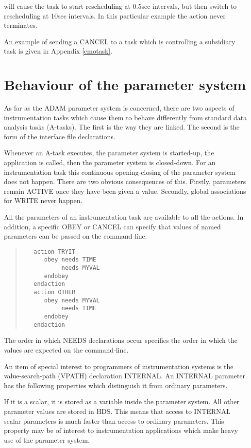 \documentclass[twoside,11pt]{article}
\newcommand{\xlabel}[1]{}
\renewcommand{\_}{\texttt{\symbol{95}}}
\begin{document}
will cause the task to start rescheduling at 0.5sec intervals, but then
switch to rescheduling at 10sec intervals. In this particular example
the action never terminates.

An example of sending a CANCEL to a task which is controlling a
subsidiary task is given in Appendix \ref{cmotask}.

\section{Behaviour of the parameter system
\xlabel{behaviour_of_the_parameter_system}}

As far as the ADAM parameter system is concerned, there are two aspects
of instrumentation tasks which cause them to behave differently from
standard data analysis tasks (A-tasks). The first is the way they are
linked. The second is the form of the interface file declarations.

Whenever an A-task executes, the parameter system is started-up, the
application is called, then the parameter system is closed-down. For an
instrumentation task this continuous opening-closing of the parameter
system does not happen. There are two obvious consequences of this.
Firstly, parameters remain ACTIVE once they have been given a value.
Secondly, global associations for WRITE never happen.

All the parameters of an instrumentation task are available to all the
actions. In addition, a specific OBEY or CANCEL can specify that values
of named parameters can be passed on the command line.

\small \begin{quote} \begin{verbatim}
   action TRYIT
      obey needs TIME
           needs MYVAL
      endobey
   endaction
   action OTHER
      obey needs MYVAL
           needs TIME
      endobey
   endaction
\end{verbatim} \end{quote} \normalsize

The order in which NEEDS declarations occur specifies the order in
which the values are expected on the command-line.

An item of special interest to programmers of instrumentation systems is
the value-search-path (VPATH) declaration INTERNAL. An INTERNAL
parameter has the following properties which distinguish it from
ordinary parameters.

If it is a scalar, it is stored as a variable inside the parameter
system. All other parameter values are stored in HDS. This means that
access to INTERNAL scalar parameters is much faster than access to
ordinary parameters. This property may be of interest to instrumentation
applications which make heavy use of the parameter system.
\end{document}
